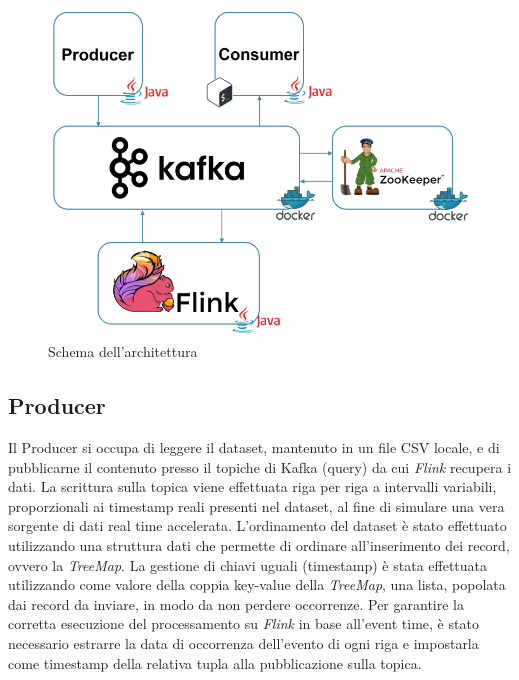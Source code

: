 \documentclass[conference]{IEEEtran}
\begin{document}
\begin{figure}[htbp]
\includegraphics[scale=0.32]{Screenshot/frameworks_structure.png}
\caption{Schema dell'architettura}\label{figura:architettura}
\label{fig}
\end{figure}

\subsection*{\textbf{Producer}}
Il Producer si occupa di leggere il ​dataset, mantenuto in un
file CSV locale, e di pubblicarne il contenuto presso il
topiche di Kafka (query) da cui \emph{Flink} recupera i dati. La scrittura sulla
topica viene effettuata riga per riga a intervalli variabili, proporzionali ai timestamp reali presenti nel dataset, al fine di simulare una
vera sorgente di dati ​real time ​accelerata. L'ordinamento del dataset \`{e} stato effettuato utilizzando una struttura dati che permette di ordinare all'inserimento dei record, ovvero la \emph{TreeMap}. La gestione di chiavi uguali (timestamp) \`{e} stata effettuata utilizzando come valore della coppia key-value della \emph{TreeMap}, una lista, popolata dai record da inviare, in modo da non perdere occorrenze.
Per garantire la corretta esecuzione del processamento su
\emph{Flink} in base all'event time,​ \`{e} stato necessario
estrarre la data di occorrenza dell'evento di ogni riga e
impostarla come ​timestamp della relativa tupla alla
pubblicazione sulla topica. 
\end{document}
